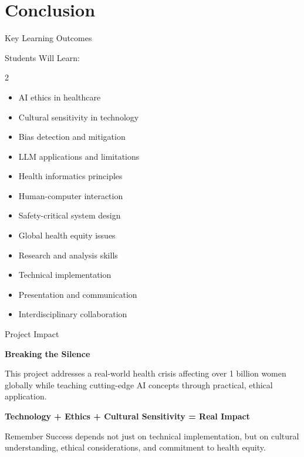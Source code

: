 \documentclass[aspectratio=169]{beamer}
\begin{document}
\section{Conclusion}

\begin{frame}{Key Learning Outcomes}
    \begin{block}{Students Will Learn:}
        \begin{multicols}{2}
            \begin{itemize}
                \item AI ethics in healthcare
                \item Cultural sensitivity in technology
                \item Bias detection and mitigation
                \item LLM applications and limitations
                \item Health informatics principles
                \item Human-computer interaction
                \item Safety-critical system design
                \item Global health equity issues
                \item Research and analysis skills
                \item Technical implementation
                \item Presentation and communication
                \item Interdisciplinary collaboration
            \end{itemize}
        \end{multicols}
    \end{block}
\end{frame}

\begin{frame}{Project Impact}
    \begin{center}
        \Large
        \textcolor{primarycolor}{\textbf{Breaking the Silence}}
        
        \vspace{1em}
        
        This project addresses a real-world health crisis affecting over 1 billion women globally while teaching cutting-edge AI concepts through practical, ethical application.
        
        \vspace{1em}
        
        \textcolor{secondarycolor}{\textbf{Technology + Ethics + Cultural Sensitivity = Real Impact}}
    \end{center}
    
    \begin{alertblock}{Remember}
        Success depends not just on technical implementation, but on cultural understanding, ethical considerations, and commitment to health equity.
    \end{alertblock}
\end{frame}
\end{document}
